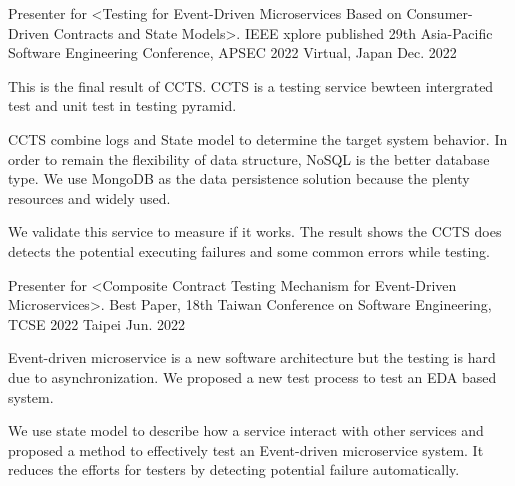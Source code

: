 

\begin{cventries}

  \cventry
    {Presenter for <Testing for Event-Driven Microservices Based on Consumer-Driven Contracts and State Models>. IEEE xplore published} %
    {29th Asia-Pacific Software Engineering Conference, APSEC 2022} %
    {Virtual, Japan} %
    {Dec. 2022} %
    {
      \begin{cvitems} %
        \item {This is the final result of CCTS. CCTS is a testing service bewteen intergrated test and unit test in testing pyramid.}
        \item {CCTS combine logs and State model to determine the target system behavior. In order to remain the flexibility of data structure, NoSQL is the better database type. We use MongoDB as the data persistence solution because the plenty resources and widely used.}
        \item {We validate this service to measure if it works. The result shows the CCTS does detects the potential executing failures and some common errors while testing.}
      \end{cvitems}
    }

  \cventry
    {Presenter for <Composite Contract Testing Mechanism for Event-Driven Microservices>.} %
    {Best Paper, 18th Taiwan Conference on Software Engineering, TCSE 2022} %
    {Taipei} %
    {Jun. 2022} %
    {
      \begin{cvitems} %
        \item {Event-driven microservice is a new software architecture but the testing is hard due to asynchronization. We proposed a new test process to test an EDA based system.}
        \item {We use state model to describe how a service interact with other services and proposed a method to effectively test an Event-driven microservice system. It reduces the efforts for testers by detecting potential failure automatically.}
      \end{cvitems}
    }


\end{cventries}
